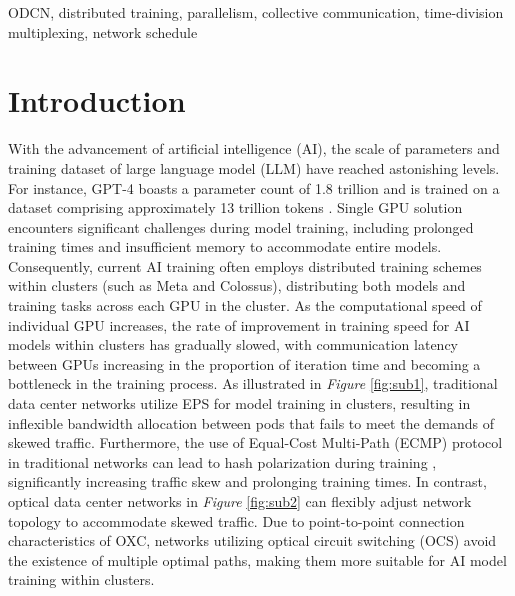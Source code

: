 \documentclass[conference]{IEEEtran}
\begin{document}
\begin{IEEEkeywords}
	ODCN, distributed training, parallelism, collective communication, time-division multiplexing, network schedule
\end{IEEEkeywords}

\section{Introduction}

With the advancement of artificial intelligence (AI), the scale of parameters and training dataset of large language model (LLM) have reached astonishing levels. For instance, GPT-4 boasts a parameter count of 1.8 trillion and is trained on a dataset comprising approximately 13 trillion tokens \cite{GPT4}. Single GPU solution encounters significant challenges during model training, including prolonged training times and insufficient memory to accommodate entire models. Consequently, current AI training often employs distributed training schemes \cite{surveyDML} within clusters (such as Meta \cite{Meta} and Colossus), distributing both models and training tasks across each GPU in the cluster. As the computational speed of individual GPU increases, the rate of improvement in training speed for AI models within clusters has gradually slowed, with communication latency between GPUs increasing in the proportion of iteration time and becoming a bottleneck in the training process. As illustrated in \emph{Figure} \ref{fig:sub1}, traditional data center networks utilize EPS for model training in clusters, resulting in inflexible bandwidth allocation between pods that fails to meet the demands of skewed traffic. Furthermore, the use of Equal-Cost Multi-Path (ECMP) protocol in traditional networks can lead to hash polarization during training \cite{HPN}, significantly increasing traffic skew and prolonging training times. In contrast, optical data center networks in \emph{Figure} \ref{fig:sub2} can flexibly adjust network topology to accommodate skewed traffic. Due to point-to-point connection characteristics of OXC, networks utilizing optical circuit switching (OCS) avoid the existence of multiple optimal paths, making them more suitable for AI model training within clusters.
\end{document}
